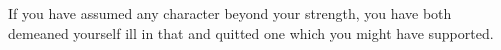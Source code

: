 If you have assumed any character beyond your strength, you have both
demeaned yourself ill in that and quitted one which you might have
supported.
